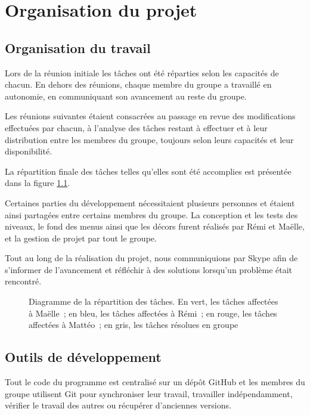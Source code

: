 \chapter{Organisation du projet}

\section{Organisation du travail}

Lors de la réunion initiale les tâches ont été réparties selon les capacités
de chacun. En dehors des réunions, chaque membre du groupe a travaillé en
autonomie, en communiquant son avancement au reste du groupe.

Les réunions suivantes étaient consacrées au passage en revue des modifications
effectuées par chacun, à l'analyse des tâches restant à effectuer et à leur
distribution entre les membres du groupe, toujours selon leurs capacités
et leur disponibilité.

La répartition finale des tâches telles qu'elles sont été accomplies
est présentée dans la figure \ref{fig:organisation-gantt}.

Certaines parties du développement nécessitaient plusieurs personnes et
étaient ainsi partagées entre certains membres du groupe. La conception
et les tests des niveaux, le fond des menus ainsi que les décors furent
réalisés par Rémi et Maëlle, et la gestion de projet par tout le groupe.

Tout au long de la réalisation du projet, nous communiquions par Skype
afin de s'informer de l'avancement et réfléchir à des solutions lorsqu'un
problème était rencontré.

\thispagestyle{empty}
\begin{figure}[p!]
    \centering
    
    \caption{
        Diagramme de la répartition des tâches. En vert, les tâches
        affectées à Maëlle~; en bleu, les tâches affectées à Rémi~;
        en rouge, les tâches affectées à Mattéo~; en gris, les
        tâches résolues en groupe
    }
    \label{fig:organisation-gantt}
\end{figure}
\restoregeometry

\section{Outils de développement}

Tout le code du programme est centralisé sur un dépôt GitHub et les membres
du groupe utilisent Git pour synchroniser leur travail, travailler
indépendamment, vérifier le travail des autres ou récupérer
d'anciennes versions.
\cite{organisation-github-skizzle}

